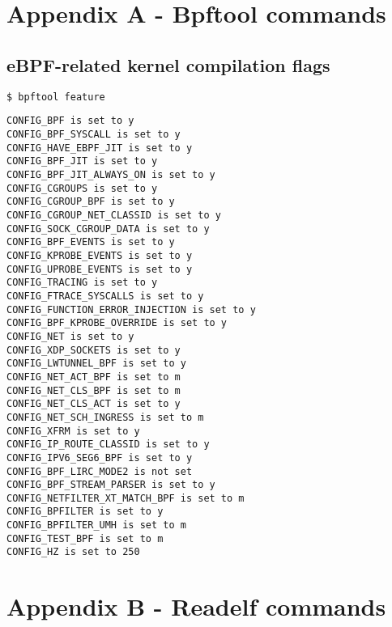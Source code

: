 
%


\chapter* {Appendix A - Bpftool commands} \label{annex:bpftool_flags_kernel}
\section*{eBPF-related kernel compilation flags} 
\begin{lstlisting}[language=bash]
$ bpftool feature
\end{lstlisting}

\begin{verbatim}
CONFIG_BPF is set to y
CONFIG_BPF_SYSCALL is set to y
CONFIG_HAVE_EBPF_JIT is set to y
CONFIG_BPF_JIT is set to y
CONFIG_BPF_JIT_ALWAYS_ON is set to y
CONFIG_CGROUPS is set to y
CONFIG_CGROUP_BPF is set to y
CONFIG_CGROUP_NET_CLASSID is set to y
CONFIG_SOCK_CGROUP_DATA is set to y
CONFIG_BPF_EVENTS is set to y
CONFIG_KPROBE_EVENTS is set to y
CONFIG_UPROBE_EVENTS is set to y
CONFIG_TRACING is set to y
CONFIG_FTRACE_SYSCALLS is set to y
CONFIG_FUNCTION_ERROR_INJECTION is set to y
CONFIG_BPF_KPROBE_OVERRIDE is set to y
CONFIG_NET is set to y
CONFIG_XDP_SOCKETS is set to y
CONFIG_LWTUNNEL_BPF is set to y
CONFIG_NET_ACT_BPF is set to m
CONFIG_NET_CLS_BPF is set to m
CONFIG_NET_CLS_ACT is set to y
CONFIG_NET_SCH_INGRESS is set to m
CONFIG_XFRM is set to y
CONFIG_IP_ROUTE_CLASSID is set to y
CONFIG_IPV6_SEG6_BPF is set to y
CONFIG_BPF_LIRC_MODE2 is not set
CONFIG_BPF_STREAM_PARSER is set to y
CONFIG_NETFILTER_XT_MATCH_BPF is set to m
CONFIG_BPFILTER is set to y
CONFIG_BPFILTER_UMH is set to m
CONFIG_TEST_BPF is set to m
CONFIG_HZ is set to 250
\end{verbatim}


\chapter* {Appendix B - Readelf commands} \label{annex:readelf_commands}
